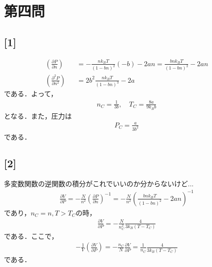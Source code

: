 \documentclass[12pt,dvipdfmx]{jsarticle}
\begin{document}
\section*{\Large{第四問}}
\subsection*{\large{[1]}}
\begin{eqnarray}
  \left( \frac{\partial P}{\partial n} \right)&&= -\frac{nk_BT}{(1-bn)^2}(-b)-2an = \frac{bnk_BT}{(1-bn)^2}-2an\\
  \left( \frac{\partial^2 P}{\partial n^2} \right)&&= 2b^2\frac{nk_BT}{(1-bn)^3}-2a
\end{eqnarray}
である．よって，
\begin{eqnarray}
  n_C =\frac{1}{3b}, \quad T_C = \frac{8a}{9k_B b}
\end{eqnarray}
となる．また，圧力は
\begin{eqnarray}
  P_C = \frac{a}{3b^2}
\end{eqnarray}
である．
\subsection*{\large{[2]}}
多変数関数の逆関数の積分がこれでいいのか分からないけど...
\begin{eqnarray}
  \frac{\partial V}{\partial P} = -\frac{N}{n^2}\left( \frac{\partial P}{\partial n} \right)^{-1} = -\frac{N}{n^2}\left( \frac{bnk_BT}{(1-bn)^2}-2an \right)^{-1}
\end{eqnarray}
であり，$n_C=n, T>T_C$の時，
\begin{eqnarray}
  \frac{\partial V}{\partial P}=-\frac{N}{n_C^2} \frac{4}{3k_B(T-T_C)}
\end{eqnarray}
である．ここで，
\begin{eqnarray}
  -\frac{1}{V}\left( \frac{\partial V}{\partial P} \right)=-\frac{n_C}{N}\frac{\partial V}{\partial P} = \frac{1}{n_C} \frac{4}{3k_B(T-T_C)}
\end{eqnarray}
である．
\end{document}
